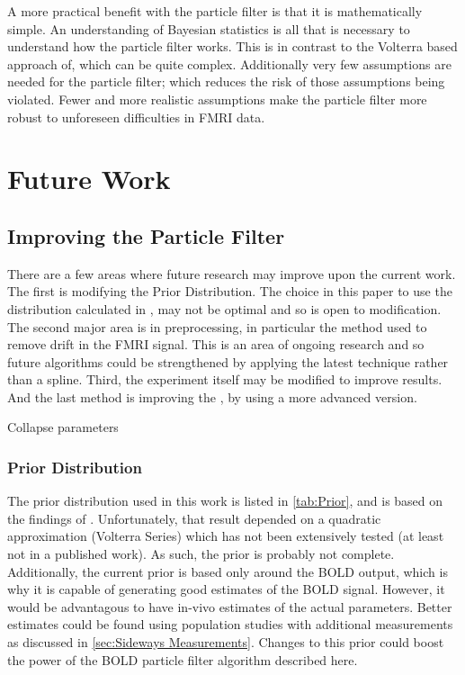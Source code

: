 A more practical benefit with the particle filter is that it is mathematically
simple. An understanding of Bayesian statistics is all that is necessary to understand
how the particle filter works. This is in contrast to the Volterra based approach
of, which can be quite complex. Additionally very few assumptions
are needed for the particle filter; which reduces the risk of those assumptions
being violated. Fewer and more realistic assumptions make the particle 
filter more robust to unforeseen difficulties in FMRI data. 

\chapter{Future Work}
\label{sec:FutureWork}
\section{Improving the Particle Filter}
\label{sec:Particle Filter Variations}

There are a few areas where future research may improve upon the current
work. The first is modifying the Prior 
Distribution. The choice in this paper to use the distribution calculated in
\cite{Friston2000}, may not be optimal and so is open to modification. The
second major area is in preprocessing, in particular the method used to remove
drift in the FMRI signal. This is an area of ongoing research and so future
algorithms could be strengthened by applying the latest technique rather than a 
spline. Third, the experiment itself may be modified to improve results.
And the last method is improving the , by using a more
advanced version.

Collapse parameters

\subsection{Prior Distribution}
The prior distribution used in this work is listed in \autoref{tab:Prior}, 
and is based on the findings of \cite{Friston2000}. Unfortunately, that
result depended on a quadratic approximation (Volterra Series) which has
not been extensively tested (at least not in a published work). As such,
the prior is probably not complete. Additionally, the current prior is
based only around the BOLD output, which is why it is capable of generating
good estimates of the BOLD signal. However, it would be advantagous to have
in-vivo estimates of the actual parameters. Better estimates could be found
using population studies with additional measurements as discussed in 
\autoref{sec:Sideways Measurements}. Changes to this prior could
boost the power of the BOLD particle filter algorithm described here. 


